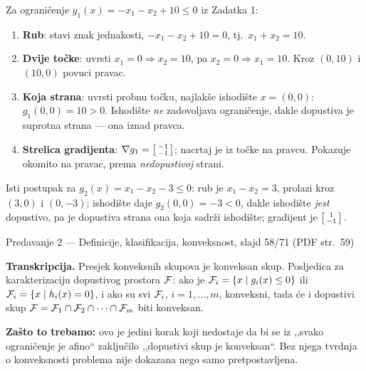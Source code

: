 \begin{korak}
Za ograničenje $g_1(x) = -x_1 - x_2 + 10 \leq 0$ iz Zadatka 1:
\begin{enumerate}[leftmargin=*]
  \item \textbf{Rub}: stavi znak jednakosti, $-x_1 - x_2 + 10 = 0$, tj.\
        $x_1 + x_2 = 10$.
  \item \textbf{Dvije točke}: uvrsti $x_1 = 0 \Rightarrow x_2 = 10$, pa
        $x_2 = 0 \Rightarrow x_1 = 10$. Kroz $(0,10)$ i $(10,0)$ povuci pravac.
  \item \textbf{Koja strana}: uvrsti probnu točku, najlakše ishodište
        $x = (0,0)$: $g_1(0,0) = 10 > 0$. Ishodište \emph{ne} zadovoljava
        ograničenje, dakle dopustiva je suprotna strana --- ona iznad pravca.
  \item \textbf{Strelica gradijenta}: $\nabla g_1 = \begin{bsmallmatrix} -1 \\ -1\end{bsmallmatrix}$;
        nacrtaj je iz točke na pravcu. Pokazuje okomito na pravac, prema
        \emph{nedopustivoj} strani.
\end{enumerate}
\end{korak}

Isti postupak za $g_2(x) = x_1 - x_2 - 3 \leq 0$: rub je $x_1 - x_2 = 3$, prolazi
kroz $(3,0)$ i $(0,-3)$; ishodište daje $g_2(0,0) = -3 < 0$, dakle ishodište
\emph{jest} dopustivo, pa je dopustiva strana ona koja sadrži ishodište;
gradijent je $\begin{bsmallmatrix} 1 \\ -1\end{bsmallmatrix}$.

\begin{izvor}{Predavanje 2 --- Definicije, klasifikacija, konveksnost, slajd 58/71 (PDF str.~59)}
\slajd[0.86]{p02-presjek-konveksnih}

\textbf{Transkripcija.} Presjek konveksnih skupova je konveksan skup. Posljedica
za karakterizaciju dopustivog prostora $\mathcal{F}$: ako je
$\mathcal{F}_i = \{x \mid g_i(x) \leq 0\}$ ili $\mathcal{F}_i = \{x \mid h_i(x) = 0\}$, i ako
su svi $\mathcal{F}_i$, $i = 1, \dots, m$, konveksni, tada će i dopustivi skup
$\mathcal{F} = \mathcal{F}_1 \cap \mathcal{F}_2 \cap \dots \cap \mathcal{F}_m$ biti konveksan.

\textbf{Zašto to trebamo:} ovo je jedini korak koji nedostaje da bi se iz ,,svako
ograničenje je afino`` zaključilo ,,dopustivi skup je konveksan``. Bez njega
tvrdnja o konveksnosti problema nije dokazana nego samo pretpostavljena.
\end{izvor}

